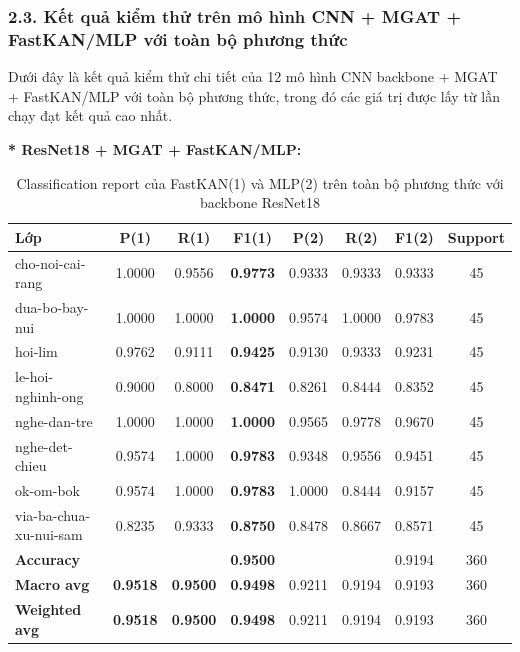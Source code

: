 \subsubsection{2.3. Kết quả kiểm thử trên mô hình CNN + MGAT + FastKAN/MLP với toàn bộ phương thức}
\indent\indent Dưới đây là kết quả kiểm thử chi tiết của 12 mô hình CNN backbone + MGAT + FastKAN/MLP với toàn bộ phương thức, trong đó các giá trị được lấy từ lần chạy đạt kết quả cao nhất.\vspace{0.3cm}

\textbf{* ResNet18 + MGAT + FastKAN/MLP:} 
\begin{table}[H] 
\centering 
\renewcommand{\arraystretch}{1.08} 
\caption{\centering Classification report của FastKAN(1) và MLP(2) trên toàn bộ phương thức với backbone ResNet18} 
\begin{tabular}{lccccccc} 
\hline \textbf{Lớp} & \textbf{P(1)} & \textbf{R(1)} & \textbf{F1(1)} & \textbf{P(2)} & \textbf{R(2)} & \textbf{F1(2)} & \textbf{Support} \\ \hline

cho-noi-cai-rang 
& 1.0000 & 0.9556 & \textbf{0.9773} 
& 0.9333 & 0.9333 & 0.9333 & 45 \\

dua-bo-bay-nui 
& 1.0000 & 1.0000 & \textbf{1.0000} 
& 0.9574 & 1.0000 & 0.9783 & 45 \\

hoi-lim 
& 0.9762 & 0.9111 & \textbf{0.9425} 
& 0.9130 & 0.9333 & 0.9231 & 45 \\

le-hoi-nghinh-ong 
& 0.9000 & 0.8000 & \textbf{0.8471} 
& 0.8261 & 0.8444 & 0.8352 & 45 \\

nghe-dan-tre 
& 1.0000 & 1.0000 & \textbf{1.0000} 
& 0.9565 & 0.9778 & 0.9670 & 45 \\

nghe-det-chieu 
& 0.9574 & 1.0000 & \textbf{0.9783} 
& 0.9348 & 0.9556 & 0.9451 & 45 \\

ok-om-bok 
& 0.9574 & 1.0000 & \textbf{0.9783} 
& 1.0000 & 0.8444 & 0.9157 & 45 \\

via-ba-chua-xu-nui-sam 
& 0.8235 & 0.9333 & \textbf{0.8750} 
& 0.8478 & 0.8667 & 0.8571 & 45 \\ 
\hline

\textbf{Accuracy} 
& & & \textbf{0.9500} 
& & & 0.9194 & 360 \\

\textbf{Macro avg} 
& \textbf{0.9518} & \textbf{0.9500} & \textbf{0.9498} 
& 0.9211 & 0.9194 & 0.9193 & 360 \\

\textbf{Weighted avg} 
& \textbf{0.9518} & \textbf{0.9500} & \textbf{0.9498} 
& 0.9211 & 0.9194 & 0.9193 & 360 \\ 
\hline 
\end{tabular} 
\end{table}

